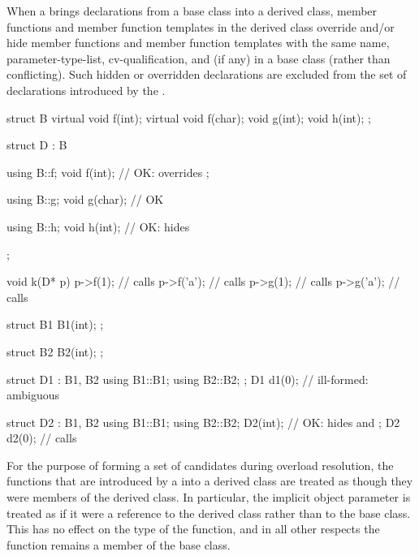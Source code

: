 \pnum
{}%
When a  brings declarations from a base class into
a derived class, member functions and member function templates in
the derived class override and/or hide member functions and member
function templates with the same name,
parameter-type-list, cv-qualification, and  (if any) in a base
class (rather than conflicting).
Such hidden or overridden declarations are excluded from the set of
declarations introduced by the .
\begin{example}
\begin{codeblock}
struct B {
  virtual void f(int);
  virtual void f(char);
  void g(int);
  void h(int);
};

struct D : B {
  using B::f;
  void f(int);      // OK:  overrides ;

  using B::g;
  void g(char);     // OK

  using B::h;
  void h(int);      // OK:  hides 
};

void k(D* p)
{
  p->f(1);          // calls 
  p->f('a');        // calls 
  p->g(1);          // calls 
  p->g('a');        // calls 
}

struct B1 {
  B1(int);
};

struct B2 {
  B2(int);
};

struct D1 : B1, B2 {
  using B1::B1;
  using B2::B2;
};
D1 d1(0);           // ill-formed: ambiguous

struct D2 : B1, B2 {
  using B1::B1;
  using B2::B2;
  D2(int);          // OK:  hides  and 
};
D2 d2(0);           // calls 
\end{codeblock}
\end{example}

\pnum
{}%
\begin{note}
For the purpose of forming a set of candidates during overload resolution,
the functions that are
introduced by a  into a derived class
are treated as though they were members of the derived class. In
particular, the implicit object parameter is treated as if
it were a reference to the derived class rather than to the base class.
This has no effect on the type of the function, and in all other
respects the function remains a member of the base class.
\end{note}

